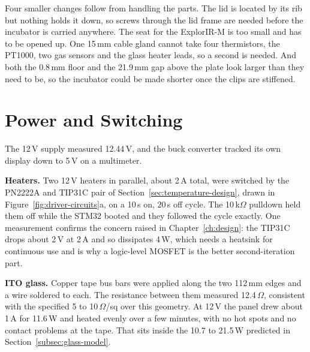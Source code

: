 Four smaller changes follow from handling the parts. The lid is located by its rib but nothing holds it down, so screws through the lid frame are needed before the incubator is carried anywhere. The seat for the ExplorIR-M is too small and has to be opened up. One 15\,mm cable gland cannot take four thermistors, the PT1000, two gas sensors and the glass heater leads, so a second is needed. And both the 0.8\,mm floor and the 21.9\,mm gap above the plate look larger than they need to be, so the incubator could be made shorter once the clips are stiffened.

\section{Power and Switching}
\label{sec:power-commissioning}

The 12\,V supply measured 12.44\,V, and the buck converter tracked its own display down to 5\,V on a multimeter.

\textbf{Heaters.} Two 12\,V heaters in parallel, about 2\,A total, were switched by the PN2222A and TIP31C pair of Section~\ref{sec:temperature-design}, drawn in Figure~\ref{fig:driver-circuits}a, on a 10\,s on, 20\,s off cycle. The 10\,k$\Omega$ pulldown held them off while the STM32 booted and they followed the cycle exactly. One measurement confirms the concern raised in Chapter~\ref{ch:design}: the TIP31C drops about 2\,V at 2\,A and so dissipates 4\,W, which needs a heatsink for continuous use and is why a logic-level MOSFET is the better second-iteration part.

\textbf{ITO glass.} Copper tape bus bars were applied along the two 112\,mm edges and a wire soldered to each. The resistance between them measured 12.4\,$\Omega$, consistent with the specified 5 to 10\,$\Omega$/sq over this geometry. At 12\,V the panel drew about 1\,A for 11.6\,W and heated evenly over a few minutes, with no hot spots and no contact problems at the tape. That sits inside the 10.7 to 21.5\,W predicted in Section~\ref{subsec:glass-model}.

